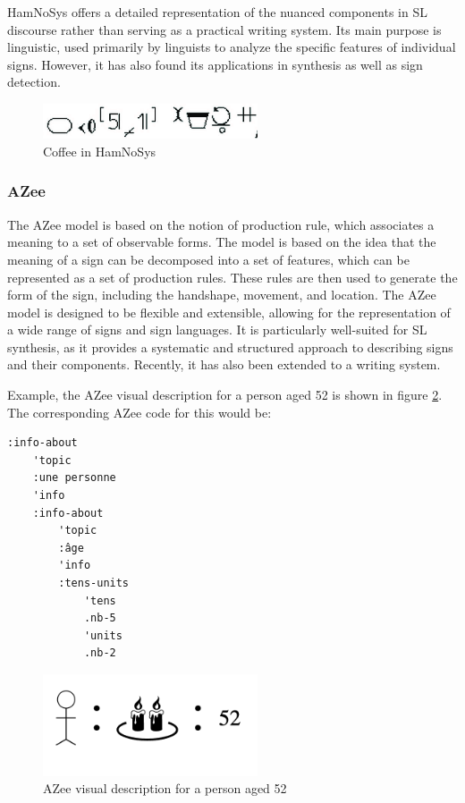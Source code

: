 \documentclass[../../main.tex]{subfiles}
\begin{document}
HamNoSys offers a detailed representation of the nuanced components in SL discourse rather than serving as a practical writing system. Its main purpose is linguistic, used primarily by linguists to analyze the specific features of individual signs. However, it has also found its applications in synthesis\cite{elliott2010towards} as well as sign detection\cite{mocialov2022unsupervised}.

\begin{figure}
  \centering \includegraphics[width = 2.5in]{chapters/background_work/images/hamnosys_coffee.png}
  \caption{Coffee in HamNoSys}
  \label{fig:hamnosys_coffee}
\end{figure}

\subsubsection{AZee}

The AZee model is based on the notion of production rule, which associates a meaning to a set of observable forms. The model is based on the idea that the meaning of a sign can be decomposed into a set of features, which can be represented as a set of production rules. These rules are then used to generate the form of the sign, including the handshape, movement, and location. The AZee model is designed to be flexible and extensible, allowing for the representation of a wide range of signs and sign languages. It is particularly well-suited for SL synthesis, as it provides a systematic and structured approach to describing signs and their components. Recently, it has also been extended to a writing system.

Example, the AZee visual description for a person aged 52 is shown in figure \ref{fig:azvd}. The corresponding AZee code for this would be:

\begin{verbatim}
:info-about
	'topic
	:une personne
	'info
	:info-about
		'topic
		:âge
		'info
		:tens-units
			'tens
			.nb-5
			'units
			.nb-2
\end{verbatim}

\begin{figure}
  \centering \includegraphics[width = 2.5in]{chapters/background_work/images/azvd.png}
  \caption{AZee visual description for a person aged 52}
  \label{fig:azvd}
\end{figure}
\end{document}
